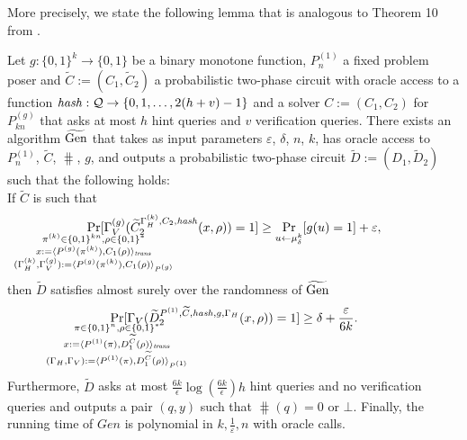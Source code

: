 More precisely, we state the following lemma that is analogous to Theorem 10 from \cite{holenstein2011general}.
\begin{lemma}
  \label{lemma:sec_amp_for_p_hash}
  Let $g: \{0,1\}^{k} \rightarrow \{0,1\}$ be a binary monotone function, $P_n^{(1)}$ a fixed
  problem poser and $\widetilde{C} := (C_1, \widetilde{C}_2)$ a probabilistic two-phase circuit
  with oracle access to a function $\operatorname{\mathit{hash}}: \mathcal{Q} \rightarrow \{0,1,\dots, 2(h+v)-1\}$
  and a solver $C := (C_1, C_2)$ for $P_{kn}^{(g)}$ that asks at most $h$ hint queries and $v$ verification queries.
  There exists an algorithm $\widetilde{\operatorname{\text{Gen}}}$ that takes as input parameters $\varepsilon$, $\delta$, $n$, $k$,
  has oracle access to $P_n^{(1)}$,  $\widetilde{C}$, $\hash$, $g$,
  and outputs a probabilistic two-phase circuit $\widetilde{D} := (D_1, \widetilde{D}_2)$ such that the following holds: \\
  If $\widetilde{C}$ is such that
  \begin{align*}
    \underset{\mathclap{\substack{
          \pi^{(k)} \in \{0,1\}^{kn}, \rho \in \{0,1\}^{*} \\
          x:= \langle P^{(g)}(\pi^{(k)}), {C}_1(\rho) \rangle_{\mathit{trans}} \\
          (\Gamma_H^{(k)}, \Gamma_V^{(g)}) := \langle P^{(g)}(\pi^{(k)}), C_1(\rho) \rangle_{P^{(g)}}}}}
    {\Pr}[\Gamma_V^{(g)}(\widetilde{C}_2^{\Gamma_H^{(k)}, C_2, \hash}(x,\rho)) = 1]
    \geq \underset{u \leftarrow \mu_\delta^k}{\Pr}[g(u) = 1] + \varepsilon,
  \end{align*}
  then $\widetilde{D}$ satisfies almost surely over the randomness of $\widetilde{\operatorname{\text{Gen}}}$
  \begin{align*}
    \underset{
      \mathclap{
      \substack{
        \pi \in \{0,1\}^{n}, \rho \in \{0,1\}^{*} \\
        x := \langle P^{(1)}(\pi), D_1^{\widetilde{C}}(\rho) \rangle_{\mathit{trans}} \\
        (\Gamma_H, \Gamma_V) := \langle P^{(1)}(\pi), D_1^{\widetilde{C}}(\rho) \rangle_{P^{(1)}}}}}
    {\Pr}[\Gamma_V(\widetilde{D}_2^{P^{(1)}, \widetilde{C}, \hash, g, \Gamma_H}(x, \rho)) = 1] \geq \delta + \frac{\varepsilon}{6k}.
  \end{align*}
  Furthermore, $\widetilde{D}$ asks at most $\frac{6k}{\epsilon}\log\left(\frac{6k}{\epsilon}\right) h$ hint queries and no verification queries
  and outputs a pair $(q, y)$ such that $\hash(q) = 0$ or $\bot$.
  Finally, the running time of $\mathit{Gen}$ is polynomial in $k, \frac{1}{\varepsilon}, n$ with oracle calls.
\end{lemma}
